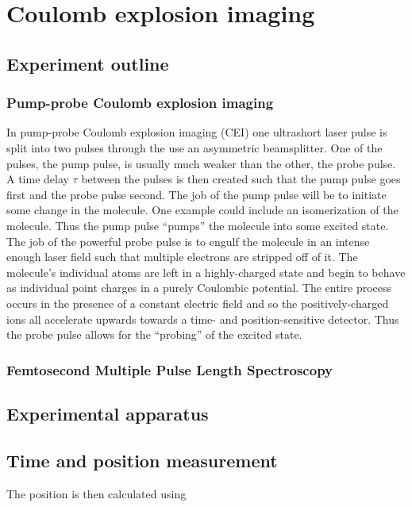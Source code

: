 \chapter{Coulomb explosion imaging}\label{ch:CEI}

\section{Experiment outline}

\subsection{Pump-probe Coulomb explosion imaging}
In pump-probe Coulomb explosion imaging (CEI) one ultrashort laser pulse is split into two pulses through the use an asymmetric beamsplitter. One of the pulses, the pump pulse, is usually much weaker than the other, the probe pulse. A time delay $\tau$ between the pulses is then created such that the pump pulse goes first and the probe pulse second. The job of the pump pulse will be to initiate some change in the molecule. One example could include an isomerization of the molecule. Thus the pump pulse ``pumps'' the molecule into some excited state. The job of the powerful probe pulse is to engulf the molecule in an intense enough laser field such that multiple electrons are stripped off of it. The molecule's individual atoms are left in a highly-charged state and begin to behave as individual point charges in a purely Coulombic potential. The entire process occurs in the presence of a constant electric field and so the positively-charged ions all accelerate upwards towards a time- and position-sensitive detector. Thus the probe pulse allows for the ``probing'' of the excited state.

\subsection{Femtosecond Multiple Pulse Length Spectroscopy}

\section{Experimental apparatus}

\section{Time and position measurement}
The position is then calculated using

